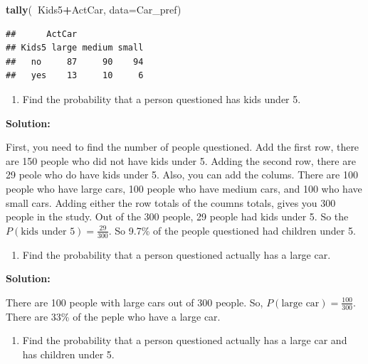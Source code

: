 \documentclass[]{book}
\newenvironment{Shaded}{\begin{snugshade}}{\end{snugshade}}
\newcommand{\DataTypeTok}[1]{\textcolor[rgb]{0.13,0.29,0.53}{#1}}
\newcommand{\KeywordTok}[1]{\textcolor[rgb]{0.13,0.29,0.53}{\textbf{#1}}}
\newcommand{\NormalTok}[1]{#1}
\newcommand{\OperatorTok}[1]{\textcolor[rgb]{0.81,0.36,0.00}{\textbf{#1}}}
\providecommand{\tightlist}{%
  \setlength{\itemsep}{0pt}\setlength{\parskip}{0pt}}
\begin{document}
\begin{Shaded}
\begin{Highlighting}[]
\KeywordTok{tally}\NormalTok{(}\OperatorTok{~}\NormalTok{Kids5}\OperatorTok{+}\NormalTok{ActCar, }\DataTypeTok{data=}\NormalTok{Car_pref)}
\end{Highlighting}
\end{Shaded}

\begin{verbatim}
##      ActCar
## Kids5 large medium small
##   no     87     90    94
##   yes    13     10     6
\end{verbatim}

\begin{enumerate}
\def\labelenumi{\alph{enumi}.}
\tightlist
\item
  Find the probability that a person questioned has kids under 5.
\end{enumerate}

\textbf{Solution: }

First, you need to find the number of people questioned. Add the first row, there are 150 people who did not have kids under 5. Adding the second row, there are 29 peole who do have kids under 5. Also, you can add the colums. There are 100 people who have large cars, 100 people who have medium cars, and 100 who have small cars. Adding either the row totals of the coumns totals, gives you 300 people in the study. Out of the 300 people, 29 people had kids under 5. So the \(P(\text{kids under 5})=\frac{29}{300}\). So 9.7\% of the people questioned had children under 5.

\begin{enumerate}
\def\labelenumi{\alph{enumi}.}
\setcounter{enumi}{1}
\tightlist
\item
  Find the probability that a person questioned actually has a large car.
\end{enumerate}

\textbf{Solution:}

There are 100 people with large cars out of 300 people. So, \(P(\text{large car})= \frac{100}{300}\). There are 33\% of the peple who have a large car.

\begin{enumerate}
\def\labelenumi{\alph{enumi}.}
\setcounter{enumi}{2}
\tightlist
\item
  Find the probability that a person questioned actually has a large car and has children under 5.
\end{enumerate}
\end{document}
